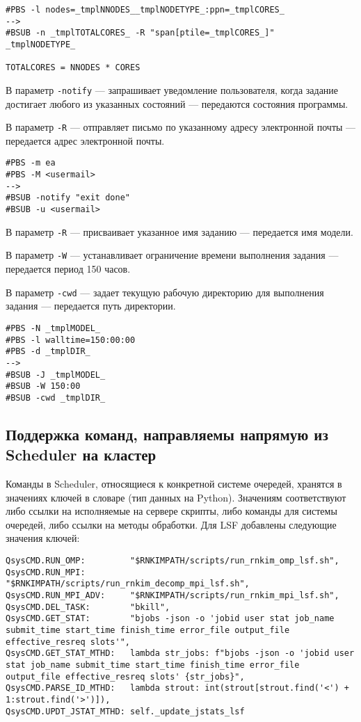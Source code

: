 \begin{lstlisting}
#PBS -l nodes=_tmplNNODES__tmplNODETYPE_:ppn=_tmplCORES_
-->
#BSUB -n _tmplTOTALCORES_ -R "span[ptile=_tmplCORES_]"
_tmplNODETYPE_

TOTALCORES = NNODES * CORES
\end{lstlisting}

В параметр \lstinline{-notify} --- запрашивает уведомление пользователя, когда задание достигает любого из указанных состояний --- передаются состояния программы.

В параметр \lstinline{-R} --- отправляет письмо по указанному адресу электронной почты --- передается адрес электронной почты.

\begin{lstlisting}
#PBS -m ea
#PBS -M <usermail>
-->
#BSUB -notify "exit done"
#BSUB -u <usermail>
\end{lstlisting}

В параметр \lstinline{-R} --- присваивает указанное имя заданию --- передается имя модели.

В параметр \lstinline{-W} --- устанавливает ограничение времени выполнения задания --- передается период 150 часов.

В параметр \lstinline{-cwd} --- задает текущую рабочую директорию для выполнения задания --- передается путь директории.

\begin{lstlisting}
#PBS -N _tmplMODEL_
#PBS -l walltime=150:00:00
#PBS -d _tmplDIR_
-->
#BSUB -J _tmplMODEL_
#BSUB -W 150:00
#BSUB -cwd _tmplDIR_
\end{lstlisting}


\subsection{Поддержка команд, направляемы напрямую из Scheduler на кластер}

Команды в Scheduler, относящиеся к конкретной системе очередей, хранятся в значениях ключей в словаре (тип данных на Python). Значениям соответствуют либо ссылки на исполняемые на сервере скрипты, либо команды для системы очередей, либо ссылки на методы обработки. Для LSF добавлены следующие значения ключей:

\begin{lstlisting}
QsysCMD.RUN_OMP:         "$RNKIMPATH/scripts/run_rnkim_omp_lsf.sh",
QsysCMD.RUN_MPI:         "$RNKIMPATH/scripts/run_rnkim_decomp_mpi_lsf.sh",
QsysCMD.RUN_MPI_ADV:     "$RNKIMPATH/scripts/run_rnkim_mpi_lsf.sh",
QsysCMD.DEL_TASK:        "bkill",
QsysCMD.GET_STAT:        "bjobs -json -o 'jobid user stat job_name submit_time start_time finish_time error_file output_file effective_resreq slots'",
QsysCMD.GET_STAT_MTHD:   lambda str_jobs: f"bjobs -json -o 'jobid user stat job_name submit_time start_time finish_time error_file output_file effective_resreq slots' {str_jobs}",
QsysCMD.PARSE_ID_MTHD:   lambda strout: int(strout[strout.find('<') + 1:strout.find('>')]),
QsysCMD.UPDT_JSTAT_MTHD: self._update_jstats_lsf
\end{lstlisting}

